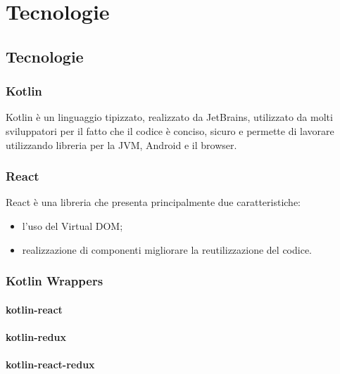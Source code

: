 
\chapter{Tecnologie}
\label{cap:tecnologie-strumenti}


\section{Tecnologie}
\label{sec:tecnologie}
\subsection*{Kotlin}
Kotlin è un linguaggio tipizzato, realizzato da JetBrains, utilizzato da molti sviluppatori per il fatto che il codice è conciso, sicuro e permette di lavorare utilizzando libreria per la JVM, Android e il browser.

\subsection*{React}
React è una libreria che presenta principalmente due caratteristiche:
\begin{itemize}
	\item l'uso del Virtual DOM;
	\item realizzazione di componenti migliorare la reutilizzazione del codice.
\end{itemize}

\subsection*{Kotlin Wrappers}
\subsubsection*{kotlin-react}
\subsubsection*{kotlin-redux}
\subsubsection*{kotlin-react-redux}

